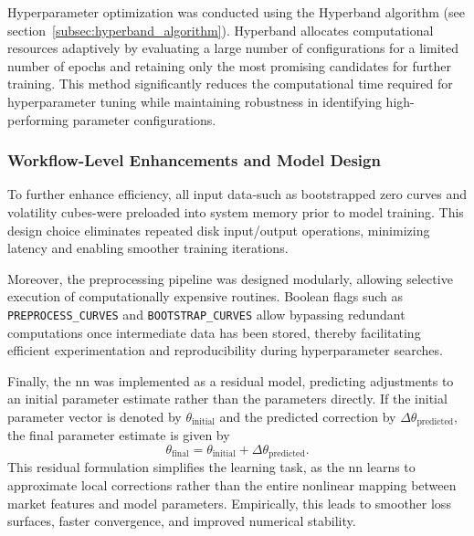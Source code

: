 Hyperparameter optimization was conducted using the Hyperband algorithm (see section~\ref{subsec:hyperband_algorithm}). Hyperband allocates computational resources adaptively by evaluating a large number of configurations for a limited number of epochs and retaining only the most promising candidates for further training. This method significantly reduces the computational time required for hyperparameter tuning while maintaining robustness in identifying high-performing parameter configurations.

\subsubsection{Workflow-Level Enhancements and Model Design}
To further enhance efficiency, all input data-such as bootstrapped zero curves and volatility cubes-were preloaded into system memory prior to model training. This design choice eliminates repeated disk input/output operations, minimizing latency and enabling smoother training iterations.

Moreover, the preprocessing pipeline was designed modularly, allowing selective execution of computationally expensive routines. Boolean flags such as \texttt{PREPROCESS\_CURVES} and \texttt{BOOTSTRAP\_CURVES} allow bypassing redundant computations once intermediate data has been stored, thereby facilitating efficient experimentation and reproducibility during hyperparameter searches.

Finally, the \ac{nn} was implemented as a residual model, predicting adjustments to an initial parameter estimate rather than the parameters directly. If the initial parameter vector is denoted by $\theta_{\text{initial}}$ and the predicted correction by $\Delta \theta_{\text{predicted}}$, the final parameter estimate is given by
\begin{equation}
	\theta_{\text{final}} = \theta_{\text{initial}} + \Delta \theta_{\text{predicted}}.
\end{equation}
This residual formulation simplifies the learning task, as the \ac{nn} learns to approximate local corrections rather than the entire nonlinear mapping between market features and model parameters. Empirically, this leads to smoother loss surfaces, faster convergence, and improved numerical stability.

